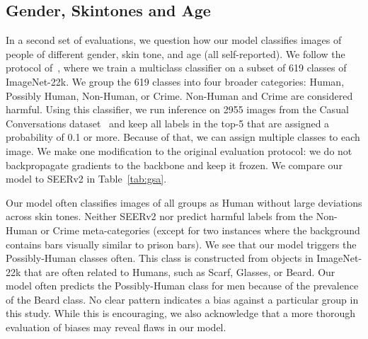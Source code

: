 \subsection{Gender, Skintones and Age}
In a second set of evaluations, we question how our model classifies images of people of different gender, skin tone, and age (all self-reported). 
We follow the protocol of~\cite{goyal2022fairness}, where we train a multiclass classifier on a subset of 619 classes of ImageNet-22k. 
We group the 619 classes into four broader categories: Human, Possibly Human, Non-Human, or Crime. 
Non-Human and Crime are considered harmful. 
Using this classifier, we run inference on 2955 images from the Casual Conversations dataset~\citep{hazirbas2021towards} and keep all labels in the top-5 that are assigned a probability of 0.1 or more. 
Because of that, we can assign multiple classes to each image. 
We make one modification to the original evaluation protocol: we do not backpropagate gradients to the backbone and keep it frozen. 
We compare our model to SEERv2 in Table~\ref{tab:gsa}. 

Our model often classifies images of all groups as Human without large deviations across skin tones. 
Neither SEERv2 nor \OURS{}  predict harmful labels from the Non-Human or Crime meta-categories (except for two instances where the background contains bars visually similar to prison bars). 
We see that our model triggers the Possibly-Human classes often. 
This class is constructed from objects in ImageNet-22k that are often related to Humans, such as Scarf, Glasses, or Beard. 
Our model often predicts the Possibly-Human class for men because of the prevalence of the Beard class. 
No clear pattern indicates a bias against a particular group in this study. 
While this is encouraging, we also acknowledge that a more thorough evaluation of biases may reveal flaws in our model.


